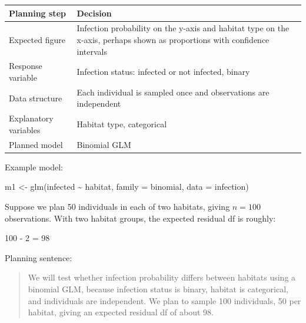 \documentclass[
  letterpaper,
  8pt,
  a4paper]{book}
\newenvironment{Shaded}{\begin{snugshade}}{\end{snugshade}}
\newcommand{\AttributeTok}[1]{\textcolor[rgb]{0.40,0.45,0.13}{#1}}
\newcommand{\FunctionTok}[1]{\textcolor[rgb]{0.28,0.35,0.67}{#1}}
\newcommand{\NormalTok}[1]{\textcolor[rgb]{0.00,0.23,0.31}{#1}}
\newcommand{\OtherTok}[1]{\textcolor[rgb]{0.00,0.23,0.31}{#1}}
\newcommand{\SpecialCharTok}[1]{\textcolor[rgb]{0.37,0.37,0.37}{#1}}
\newcounter{none} %
\begin{document}
{\def\LTcaptype{none} %
\begin{longtable}[]{@{}
  >{\raggedright\arraybackslash}p{}
  >{\raggedright\arraybackslash}p{}@{}}
\toprule\noalign{}
\begin{minipage}[b]{\linewidth}\raggedright
Planning step
\end{minipage} & \begin{minipage}[b]{\linewidth}\raggedright
Decision
\end{minipage} \\
\midrule\noalign{}
\endhead
\bottomrule\noalign{}
\endlastfoot
Expected figure & Infection probability on the y-axis and habitat type
on the x-axis, perhaps shown as proportions with confidence intervals \\
Response variable & Infection status: infected or not infected,
binary \\
Data structure & Each individual is sampled once and observations are
independent \\
Explanatory variables & Habitat type, categorical \\
Planned model & Binomial GLM \\
\end{longtable}
}

Example model:

\begin{Shaded}
\begin{Highlighting}[]
\NormalTok{m1 }\OtherTok{\textless{}{-}} \FunctionTok{glm}\NormalTok{(infected }\SpecialCharTok{\textasciitilde{}}\NormalTok{ habitat, }\AttributeTok{family =}\NormalTok{ binomial, }\AttributeTok{data =}\NormalTok{ infection)}
\end{Highlighting}
\end{Shaded}

Suppose we plan 50 individuals in each of two habitats, giving
\(n = 100\) observations. With two habitat groups, the expected residual
df is roughly:

\begin{Shaded}
\begin{Highlighting}[]
\NormalTok{100 {-} 2 = 98}
\end{Highlighting}
\end{Shaded}

Planning sentence:

\begin{quote}
We will test whether infection probability differs between habitats
using a binomial GLM, because infection status is binary, habitat is
categorical, and individuals are independent. We plan to sample 100
individuals, 50 per habitat, giving an expected residual df of about 98.
\end{quote}
\end{document}
